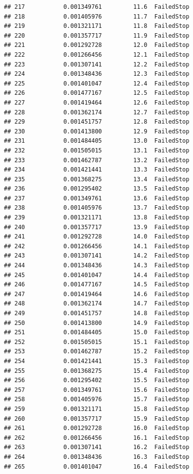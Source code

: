 \documentclass[
]{article}
\begin{document}
\begin{verbatim}
## 217           0.001349761         11.6  FailedStop
## 218           0.001405976         11.7  FailedStop
## 219           0.001321171         11.8  FailedStop
## 220           0.001357717         11.9  FailedStop
## 221           0.001292728         12.0  FailedStop
## 222           0.001266456         12.1  FailedStop
## 223           0.001307141         12.2  FailedStop
## 224           0.001348436         12.3  FailedStop
## 225           0.001401047         12.4  FailedStop
## 226           0.001477167         12.5  FailedStop
## 227           0.001419464         12.6  FailedStop
## 228           0.001362174         12.7  FailedStop
## 229           0.001451757         12.8  FailedStop
## 230           0.001413800         12.9  FailedStop
## 231           0.001484405         13.0  FailedStop
## 232           0.001505015         13.1  FailedStop
## 233           0.001462787         13.2  FailedStop
## 234           0.001421441         13.3  FailedStop
## 235           0.001368275         13.4  FailedStop
## 236           0.001295402         13.5  FailedStop
## 237           0.001349761         13.6  FailedStop
## 238           0.001405976         13.7  FailedStop
## 239           0.001321171         13.8  FailedStop
## 240           0.001357717         13.9  FailedStop
## 241           0.001292728         14.0  FailedStop
## 242           0.001266456         14.1  FailedStop
## 243           0.001307141         14.2  FailedStop
## 244           0.001348436         14.3  FailedStop
## 245           0.001401047         14.4  FailedStop
## 246           0.001477167         14.5  FailedStop
## 247           0.001419464         14.6  FailedStop
## 248           0.001362174         14.7  FailedStop
## 249           0.001451757         14.8  FailedStop
## 250           0.001413800         14.9  FailedStop
## 251           0.001484405         15.0  FailedStop
## 252           0.001505015         15.1  FailedStop
## 253           0.001462787         15.2  FailedStop
## 254           0.001421441         15.3  FailedStop
## 255           0.001368275         15.4  FailedStop
## 256           0.001295402         15.5  FailedStop
## 257           0.001349761         15.6  FailedStop
## 258           0.001405976         15.7  FailedStop
## 259           0.001321171         15.8  FailedStop
## 260           0.001357717         15.9  FailedStop
## 261           0.001292728         16.0  FailedStop
## 262           0.001266456         16.1  FailedStop
## 263           0.001307141         16.2  FailedStop
## 264           0.001348436         16.3  FailedStop
## 265           0.001401047         16.4  FailedStop

\end{verbatim}
\end{document}
